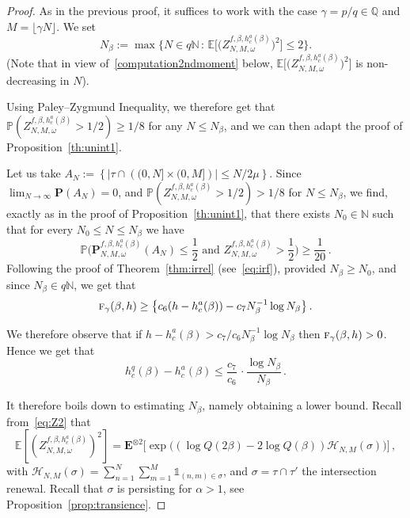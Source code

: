 \documentclass[AHL,Unicode,longabstracts]{cedram}
\newcommand{\ga}{\alpha}
\newcommand{\gb}{\beta}
\newcommand{\go}{\omega}
\newcommand{\unbf}%
{\mathds{1}}
\newcommand{\tf}{\textsc{f}} %
\newcommand{\cH}{\ensuremath{\mathcal{H}}}
\newcommand{\bP}{\ensuremath{\mathbf{P}}}
\newcommand{\bE}{\ensuremath{\mathbf{E}}}
\newcommand{\bbE}{\ensuremath{\mathbb{E}}}
\newcommand{\bbN}{\ensuremath{\mathbb{N}}}
\newcommand{\bbP}{\ensuremath{\mathbb{P}}}
\newcommand{\bbQ}{\ensuremath{\mathbb{Q}}}
\begin{document}
\begin{proof}
As in the previous proof, it suffices to work with the case $\gamma = p/q\in \bbQ$ and $M=\lfloor \gamma N \rfloor$. We set
\begin{equation}
N_\beta := \max \Big \lbrace N \in q\bbN\,:\,\bbE \Big[\Big(Z^{f,\beta,h_c^a(\beta)}_{N,M,\omega} \Big)^2 \Big] \le 2 \Big \rbrace.
\end{equation}
(Note that in view of~\eqref{computation2ndmoment} below, $\bbE \big[\big(Z^{f,\beta,h_c^a(\beta)}_{N,M,\omega} \big)^2 \big]$ is non-decreasing in $N$).

Using Paley--Zygmund Inequality, we therefore get that $\bbP(Z_{N,M,\go}^{f,\beta,h_c^a(\beta)} >1/2) \geq 1/8$ for any $N\leq N_{\gb}$, and we can then adapt the proof of Proposition~\ref{th:unint1}.

Let us take $A_{N} :=\left\lbrace \vert \tau \cap \left((0,N] \times (0,M] \right) \rvert \le N/{2 \mu} \right\rbrace$. Since $\lim_{N \to \infty} \bP(A_N) =0$, and $\bbP(Z_{N,M,\go}^{f,\beta,h_c^a(\beta)} >1/2) >1/8$ for $N\leq N_{\gb}$, we find, exactly as in the proof of Proposition~\ref{th:unint1}, that there exists $N_0 \in \bbN$ such that for every $N_0 \le N \le N_\beta$ we have
\begin{equation}
\bbP \Big(\bP^{f,\gb,h_c^{a}(\gb)}_{N,M,\omega} (A_N)\le \frac{1}{2}
\text{ and } Z^{f,\gb,h_c^{a}(\gb)}_{N,M,\omega} > \frac{1}{2} \Big) \ge \frac{1}{20}\,.
\end{equation}
Following the proof of Theorem~\ref{thm:irrel} (see~\eqref{eq:irf}), provided $N_{\gb} \geq N_0$, and since $N_{\gb} \in q\bbN$, we get that
\begin{equation}
\tf_{\gamma}(\gb,h) \geq \big \{ c_6 (h- h_c^a(\beta)) - c_7 N_{\gb}^{-1} \log N_{\gb} \big \}\,.
\end{equation}

We therefore observe that if $h- h_c^a(\beta) > c_7/c_6 N_{\gb}^{-1} \log N_{\gb}$ then $\tf_\gamma(\beta,h) >0$. Hence we get that
\begin{equation}\label{eq:hNbeta}
h_c^ q(\beta) - h_c ^a(\beta) \le \frac{c_7}{c_6}\,\cdot \frac{\log N_\beta}{N_\beta}\,.
\end{equation}


It therefore boils down to estimating $N_\beta$, namely obtaining a lower bound. Recall from~\eqref{eq:Z2} that
\begin{equation}\label{computation2ndmoment}
\bbE \left[\left(Z^{f,\beta,h_c^a(\beta)}_{N,M,\omega} \right)^2 \right] = \bE^{\otimes 2} \Big[\exp \Big((\log Q(2 \beta) - 2 \log Q(\beta)) \cH_{N,M}(\sigma) \Big) \Big]\,,
\end{equation}
with $\cH_{N,M}(\sigma) = \sum_{n=1}^N \sum_{m=1}^M \unbf_{(n,m) \in \sigma}$, and $\sigma = \tau \cap \tau'$ the intersection renewal. Recall that $\sigma$ is persisting for $\ga > 1$, see Proposition~\ref{prop:transience}.


\end{proof}
\end{document}
